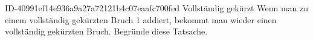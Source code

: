 \begin{exercise}
      {ID-40991ef14e936a9a27a72121b4c07eaafc700fed}
      {Vollständig gekürzt}
  \ifproblem\problem
    Wenn man zu einem vollständig gekürzten Bruch 1 addiert, bekommt man
    wieder einen vollständig gekürzten Bruch. Begründe diese Tatsache.
  \fi
\end{exercise}
